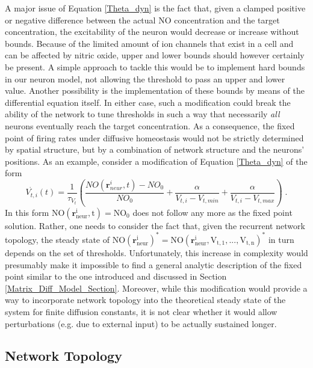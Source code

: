 \documentclass[10pt,a4paper]{article}
\begin{document}
A major issue of Equation \eqref{Theta_dyn} is the fact that, given a clamped positive or negative difference between the actual NO concentration and the target concentration, the excitability of the neuron would decrease or increase without bounds. Because of the limited amount of ion channels that exist in a cell and can be affected by nitric oxide, upper and lower bounds should however certainly be present. A simple approach to tackle this would be to implement hard bounds in our neuron model, not allowing the threshold to pass an upper and lower value. Another possibility is the implementation of these bounds by means of the differential equation itself. In either case, such a modification could break the ability of the network to tune thresholds in such a way that necessarily \emph{all} neurons eventually reach the target concentration. As a consequence, the fixed point of firing rates under diffusive homeostasis would not be strictly determined by spatial structure, but by a combination of network structure and the neurons' positions. As an example, consider a modification of Equation \eqref{Theta_dyn} of the form
\begin{equation}
\dot{V_{t,i}}(t) = \frac{1}{\tau_{V_t}}\left(\frac{NO(\mathbf{r}_{neur}^i,t)-NO_0}{NO_0} + \frac{\alpha}{V_{t,i} - V_{t,min}} + \frac{\alpha}{V_{t,i} - V_{t,max}}\right) \; .
\label{Theta_dyn_with_Bounds}
\end{equation}
In this form $\mathrm{NO(\mathbf{r}_{neur}^i,t) = NO_0}$ does not follow any more as the fixed point solution. Rather, one needs to consider the fact that, given the recurrent network topology, the steady state of $\mathrm{NO(\mathbf{r}_{neur}^i)^* = NO(\mathbf{r}_{neur}^i,V_{t,1},...,V_{t,n})^*}$ in turn depends on the set of thresholds. Unfortunately, this increase in complexity would presumably make it impossible to find a general analytic description of the fixed point similar to the one introduced and discussed in Section \ref{Matrix_Diff_Model_Section}. Moreover, while this modification would provide a way to incorporate network topology into the theoretical steady state of the system for finite diffusion constants, it is not clear whether it would allow perturbations (e.g. due to external input) to be actually sustained longer.

\subsection{Network Topology} 
\end{document}
